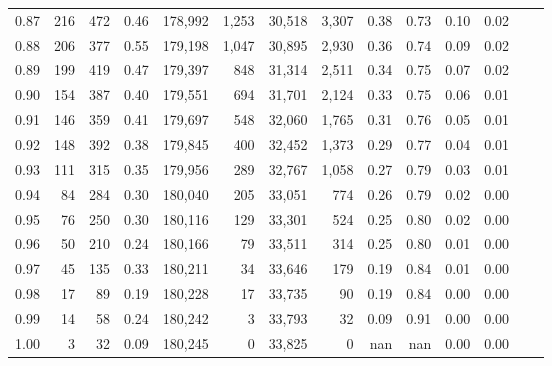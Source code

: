 \begin{tabular}{rrrrrrrrrrrrrr}
0.87 &    216 &  472 &    0.46 &  178,992 &    1,253 &  30,518 &   3,307 &  0.38 &  0.73 &  0.10 &      0.02 \\
0.88 &    206 &  377 &    0.55 &  179,198 &    1,047 &  30,895 &   2,930 &  0.36 &  0.74 &  0.09 &      0.02 \\
0.89 &    199 &  419 &    0.47 &  179,397 &      848 &  31,314 &   2,511 &  0.34 &  0.75 &  0.07 &      0.02 \\
0.90 &    154 &  387 &    0.40 &  179,551 &      694 &  31,701 &   2,124 &  0.33 &  0.75 &  0.06 &      0.01 \\
0.91 &    146 &  359 &    0.41 &  179,697 &      548 &  32,060 &   1,765 &  0.31 &  0.76 &  0.05 &      0.01 \\
0.92 &    148 &  392 &    0.38 &  179,845 &      400 &  32,452 &   1,373 &  0.29 &  0.77 &  0.04 &      0.01 \\
0.93 &    111 &  315 &    0.35 &  179,956 &      289 &  32,767 &   1,058 &  0.27 &  0.79 &  0.03 &      0.01 \\
0.94 &     84 &  284 &    0.30 &  180,040 &      205 &  33,051 &     774 &  0.26 &  0.79 &  0.02 &      0.00 \\
0.95 &     76 &  250 &    0.30 &  180,116 &      129 &  33,301 &     524 &  0.25 &  0.80 &  0.02 &      0.00 \\
0.96 &     50 &  210 &    0.24 &  180,166 &       79 &  33,511 &     314 &  0.25 &  0.80 &  0.01 &      0.00 \\
0.97 &     45 &  135 &    0.33 &  180,211 &       34 &  33,646 &     179 &  0.19 &  0.84 &  0.01 &      0.00 \\
0.98 &     17 &   89 &    0.19 &  180,228 &       17 &  33,735 &      90 &  0.19 &  0.84 &  0.00 &      0.00 \\
0.99 &     14 &   58 &    0.24 &  180,242 &        3 &  33,793 &      32 &  0.09 &  0.91 &  0.00 &      0.00 \\
1.00 &      3 &   32 &    0.09 &  180,245 &        0 &  33,825 &       0 &   nan &   nan &  0.00 &      0.00 \\
\bottomrule
\end{tabular}
